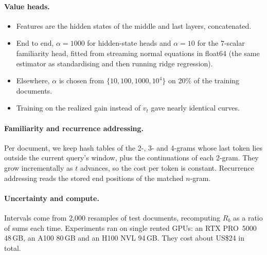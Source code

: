 \documentclass[11pt]{article}
\newcommand{\Rb}[1]{R_{#1}}
\begin{document}
\paragraph{Value heads.}
\begin{itemize}
\item Features are the hidden states of the middle and last layers, concatenated.
\item End to end, $\alpha=1000$ for hidden-state heads and $\alpha=10$ for the 7-scalar familiarity head, fitted from streaming normal equations in float64 (the same estimator as standardising and then running ridge regression).
\item Elsewhere, $\alpha$ is chosen from $\{10,100,1000,10^4\}$ on 20\% of the training documents.
\item Training on the realized gain instead of $v_t$ gave nearly identical curves.
\end{itemize}

\paragraph{Familiarity and recurrence addressing.} Per document, we keep hash tables of the 2-, 3- and 4-grams whose last token lies outside the current query's window, plus the continuations of each 2-gram. They grow incrementally as $t$ advances, so the cost per token is constant. Recurrence addressing reads the stored end positions of the matched $n$-gram.

\paragraph{Uncertainty and compute.} Intervals come from 2,000 resamples of test documents, recomputing $\Rb{b}$ as a ratio of sums each time. Experiments ran on single rented GPUs: an RTX PRO~5000 48\,GB, an A100 80\,GB and an H100 NVL 94\,GB. They cost about US\$24 in total.
\end{document}

